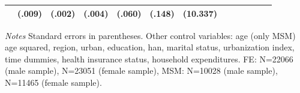\begin{table}[h]
\begin{adjustbox}{max width=\linewidth}
\begin{threeparttable}
{\begin{tabular}{l*{6}{SS}}
                &   (.009)         &   (.002)         &   (.004)         &   (.060)         &   (.148)         & (10.337)         \\                          
\bottomrule
\end{tabular}
\begin{tablenotes}
\item \textit{Notes}   Standard errors in parentheses.
Other control variables: age (only MSM) age squared, region, urban, education, han, marital status, urbanization index, time dummies, health insurance status, household expenditures. FE:  N=22066 (male sample), N=23051 (female sample), MSM: N=10028 (male sample), N=11465 (female sample).
\end{tablenotes}
}
\end{threeparttable}
\end{adjustbox}
\end{table}




